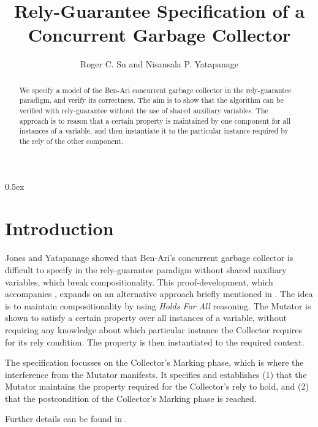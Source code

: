 \documentclass[11pt,a4paper]{article}
\begin{document}
\title{Rely-Guarantee Specification of a Concurrent Garbage Collector}
\author{Roger C. Su and Nisansala P. Yatapanage}
\maketitle

\begin{abstract}
We specify a model of the Ben-Ari concurrent garbage collector in the
rely-guarantee paradigm, and verify its correctness. The aim is to show
that the algorithm can be verified with rely-guarantee without the use of 
shared auxiliary variables. The approach is to reason that a certain
property is maintained by one component for all instances of a variable,
and then instantiate it to the particular instance required by the rely
of the other component.   
\end{abstract}

\tableofcontents

\parindent 0pt\parskip 0.5ex

\section{Introduction}

Jones and Yatapanage \cite{Jones-Yatapanage-19} showed that Ben-Ari's concurrent garbage collector \cite{BenAri-84} is difficult to specify in the rely-guarantee paradigm without shared auxiliary variables, which break compositionality.
%
This proof-development, which accompanies \cite{Yatapanage-26a,Yatapanage-26}, expands on an alternative approach briefly mentioned in 
\cite{Jones-Yatapanage-19}. 
%
The idea is to maintain compositionality by using \emph{Holds For All} reasoning. The Mutator is shown to satisfy a certain property over all instances of a variable, without requiring any knowledge about which particular instance the Collector requires for its rely condition.
The property is then instantiated to the required context. 

The specification focusses on the Collector's Marking phase, which is where the interference from the Mutator manifests.
It specifies and establishes (1) that the Mutator maintains the property required for the Collector's rely to hold, and (2) that the postcondition of the Collector's Marking phase is reached.

Further details can be found in \cite{Yatapanage-26a,Yatapanage-26}.





\end{document}
